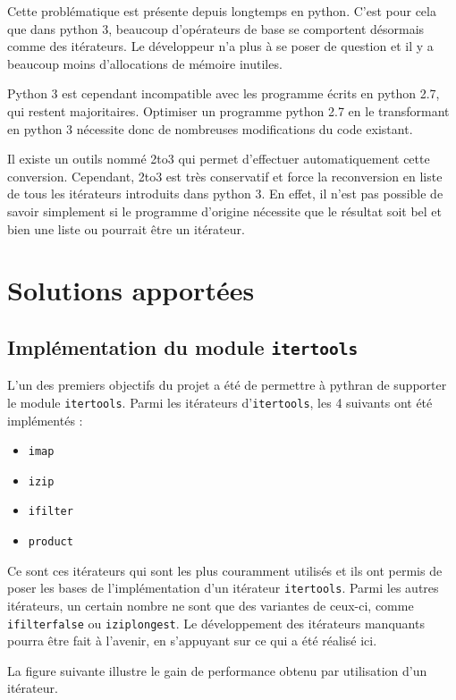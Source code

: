 \documentclass[a4paper]{article}
\begin{document}
Cette problématique est présente depuis longtemps en python. C'est
pour cela que dans python 3, beaucoup d'opérateurs de base se
comportent désormais comme des itérateurs. Le développeur n'a plus à
se poser de question et il y a beaucoup moins d'allocations de mémoire
inutiles.

Python 3 est cependant incompatible avec les programme écrits en
python 2.7, qui restent majoritaires. Optimiser un programme python
2.7 en le transformant en python 3 nécessite donc de nombreuses
modifications du code existant.

Il existe un outils nommé 2to3 qui permet d'effectuer automatiquement
cette conversion. Cependant, 2to3 est très conservatif et force la
reconversion en liste de tous les itérateurs introduits dans python
3. En effet, il n'est pas possible de savoir simplement si le
programme d'origine nécessite que le résultat soit bel et bien une
liste ou pourrait être un itérateur.


\section*{Solutions apportées}

\subsection*{Implémentation du module \texttt{itertools}}

L'un des premiers objectifs du projet a été de permettre à pythran de
supporter le module \texttt{itertools}. Parmi les itérateurs d'\texttt{itertools}, les
4 suivants ont été implémentés :

\begin{itemize}
  \item \texttt{imap}
  \item \texttt{izip}
  \item \texttt{ifilter}
  \item \texttt{product}
\end{itemize}

Ce sont ces itérateurs qui sont les plus couramment utilisés et ils
ont permis de poser les bases de l'implémentation d'un itérateur
\texttt{itertools}. Parmi les autres itérateurs, un certain nombre ne
sont que des variantes de ceux-ci, comme \texttt{ifilterfalse} ou
\texttt{iziplongest}. Le développement des itérateurs manquants pourra
être fait à l'avenir, en s'appuyant sur ce qui a été réalisé ici.

La figure suivante illustre le gain de performance obtenu par
utilisation d'un itérateur.
\end{document}
